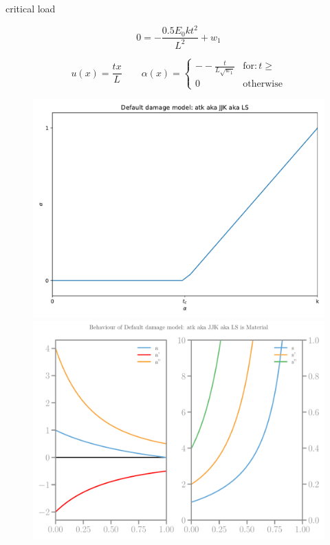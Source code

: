 \documentclass[]{article}
\begin{document}
critical load

$$
0=- \frac{0.5 E_{0} k t^{2}}{L^{2}} + w_{1}
$$

\begin{equation}
  \label{eqn:mod-crit}
    u{\left(x \right)} = \frac{t x}{L} \qquad
  \alpha{\left(x \right)} = 
  \begin{cases} 
      -- \frac{t}{L \sqrt{w_{1}}} & \text{for}: t \geq \\ 
      0 & \text{otherwise}
  \end{cases}
\end{equation}


\begin{figure}[htbp]
  \centering
  \includegraphics[width=.33\textheight]{../figures/atk-alpha-homog.pdf}
  \includegraphics[width=.33\textheight]{../figures/atk-model.pdf}

\end{figure}
\end{document}
